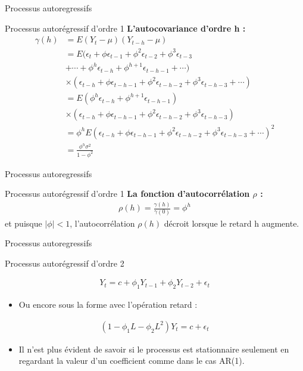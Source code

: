 \documentclass{beamer}
\begin{document}
\begin{frame}{Processus autoregressifs}
\begin{block}{Processus autorégressif d’ordre 1}
\textbf{L’autocovariance d’ordre h :}
\begin{align*}
\gamma(h) & =E(Y_t-\mu)(Y_{t-h}-\mu) \\ & = E(\epsilon_t+\phi \epsilon_{t-1}+\phi^2 \epsilon_{t-2}+\phi^3 \epsilon_{t-3} \\ & +\cdots+\phi^h\epsilon_{t-h}+\phi^{h+1}\epsilon_{t-h-1}+\cdots) \\ & \times (\epsilon_{t-h} +\phi \epsilon_{t-h-1} +\phi^2\epsilon_{t-h-2}+\phi^3\epsilon_{t-h-3}+\cdots) \\ & = E(\phi^h\epsilon_{t-h}+\phi^{h+1}\epsilon_{t-h-1}) \\ & \times(\epsilon_{t-h} +\phi \epsilon_{t-h-1} +\phi^2\epsilon_{t-h-2}+\phi^3\epsilon_{t-h-3}) \\ & =\phi^hE(\epsilon_{t-h} +\phi \epsilon_{t-h-1} +\phi^2\epsilon_{t-h-2}+\phi^3\epsilon_{t-h-3}+\cdots)^2 \\ & = \frac{\phi^h\sigma^2}{1-\phi^2}
\end{align*}
\end{block}
\end{frame}


\begin{frame}{Processus autoregressifs}
\begin{block}{Processus autorégressif d’ordre 1}
\textbf{La fonction d’autocorrélation $\rho$ :}
\begin{align*}
\rho(h)=\frac{\gamma(h)}{\gamma(0)}=\phi^h
\end{align*}
et puisque $\mid \phi \mid < 1$, l’autocorrélation $\rho(h)$ décroit lorsque le retard h augmente.
\end{block}
\end{frame}


\begin{frame}{Processus autoregressifs}
\begin{block}{Processus autorégressif d’ordre 2}

\begin{align*}
Y_t=c+\phi_1 Y_{t-1}+\phi_2 Y_{t-2}+\epsilon_t
\end{align*}
\begin{itemize}
\item Ou encore sous la forme avec l’opération retard :
\end{itemize}
\begin{align*}
(1-\phi_1L-\phi_2L^2)Y_t=c+\epsilon_t
\end{align*}
\begin{itemize}
\item  Il n’est plus évident de savoir si le processus est stationnaire seulement en regardant la valeur d’un coefficient comme dans le cas AR(1).
\end{itemize}
\end{block}
\end{frame}
\end{document}
